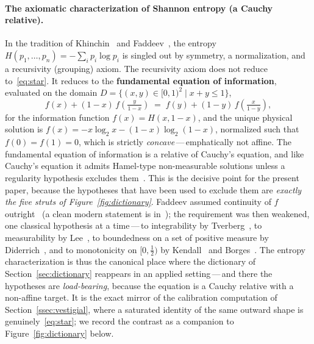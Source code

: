 \documentclass{article}
\theoremstyle{plain}
\theoremstyle{definition}
\begin{document}
\paragraph{The axiomatic characterization of Shannon entropy (a Cauchy relative).}
In the tradition of Khinchin~\cite{Khinchin1957} and
Faddeev~\cite{Faddeev1957}, the entropy
$H(p_1,\ldots,p_n)=-\sum_i p_i\log p_i$ is singled out by symmetry, a
normalization, and a recursivity (grouping) axiom. The recursivity
axiom does not reduce to~\eqref{eq:star}. It reduces to the
\textbf{fundamental equation of information}, evaluated on the domain $D = \{(x, y) \in [0, 1)^2 \mid x + y \le 1\}$,
\[
f(x)+(1-x)\,f\!\left(\tfrac{y}{1-x}\right)
\;=\;f(y)+(1-y)\,f\!\left(\tfrac{x}{1-y}\right),
\]
for the information function $f(x)=H(x,1-x)$, and the unique physical
solution is $f(x)=-x\log_2 x-(1-x)\log_2(1-x)$, normalized such that $f(0)=f(1)=0$, which is strictly
\emph{concave}\,---\,emphatically not affine. The fundamental
equation of information is a relative of Cauchy's equation, and like
Cauchy's equation it admits Hamel-type non-measurable solutions
unless a regularity hypothesis excludes them~\cite{AczelDaroczy1975}.
This is the decisive point for the present paper, because the
hypotheses that have been used to exclude them are \emph{exactly the
five struts of Figure~\ref{fig:dictionary}}. Faddeev assumed continuity
of $f$ outright~\cite{Faddeev1957} (a clean modern statement is
in~\cite{BaezFritzLeinster2011}); the requirement was then weakened,
one classical hypothesis at a time\,---\,to integrability by
Tverberg~\cite{Tverberg1958}, to measurability by
Lee~\cite{Lee1964}, to boundedness on a set of positive measure by
Diderrich~\cite{Diderrich1975}, and to monotonicity on
$[0,\tfrac{1}{2})$ by Kendall~\cite{Kendall1964} and
Borges~\cite{Borges1967}. The entropy characterization is thus the
canonical place where the dictionary of Section~\ref{sec:dictionary}
reappears in an applied setting\,---\,and there the hypotheses are
\emph{load-bearing}, because the equation is a Cauchy relative with a
non-affine target. It is the exact mirror of the calibration
computation of Section~\ref{ssec:vestigial}, where a saturated
identity of the same outward shape is genuinely~\eqref{eq:star}; we
record the contrast as a companion to Figure~\ref{fig:dictionary}
below.
\end{document}
